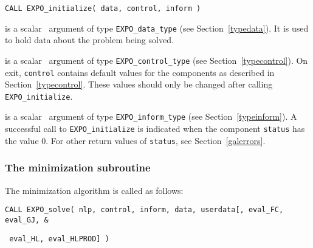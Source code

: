\documentclass{galahad}
\newcommand{\packagename}{EXPO}
\begin{document}
\hspace{8mm}
{\tt CALL \packagename\_initialize( data, control, inform )}

\vspace*{-2mm}
\begin{description}

 is a scalar \intentinout\ argument of type
{\tt \packagename\_data\_type}
(see Section~\ref{typedata}). It is used to hold data about the problem being
solved.

 is a scalar \intentout\ argument of type
{\tt \packagename\_control\_type}
(see Section~\ref{typecontrol}).
On exit, {\tt control} contains default values for the components as
described in Section~\ref{typecontrol}.
These values should only be changed after calling
{\tt \packagename\_initialize}.

 is a scalar \intentout\ argument of type
{\tt \packagename\_inform\_type}
(see Section~\ref{typeinform}). A successful call to
{\tt \packagename\_initialize}
is indicated when the  component {\tt status} has the value 0.
For other return values of {\tt status}, see Section~\ref{galerrors}.

\end{description}


\subsubsection{The minimization subroutine}
The minimization algorithm is called as follows:
\vspace*{1mm}

\hspace{8mm}
{\tt CALL \packagename\_solve( nlp, control, inform, data, userdata[, eval\_FC,
eval\_GJ, \hspace{8mm}                  \&}
\vspace*{-1mm}

\hspace{37mm}
{\tt
eval\_HL,  eval\_HLPROD] )}
\end{document}
